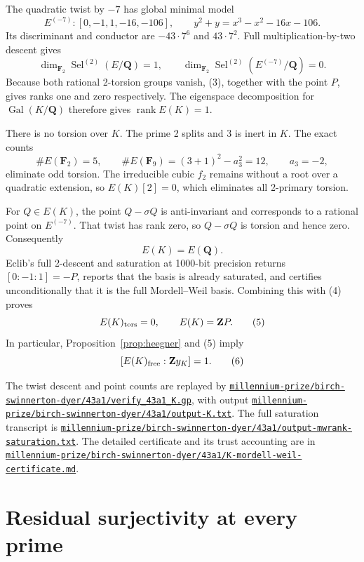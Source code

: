 \documentclass[11pt]{article}
\newcommand{\Q}{\mathbf Q}
\newcommand{\F}{\mathbf F}
\newcommand{\Z}{\mathbf Z}
\newcommand{\Gal}{\operatorname{Gal}}
\newcommand{\Sel}{\operatorname{Sel}}
\newcommand{\artifact}[1]{\href{run:../#1}{\nolinkurl{#1}}}
\begin{document}
The quadratic twist by \(-7\) has global minimal model
\[
 E^{(-7)}:[0,-1,1,-16,-106],
 \qquad y^2+y=x^3-x^2-16x-106.
\]
Its discriminant and conductor are \(-43\cdot7^6\) and \(43\cdot7^2\).
Full multiplication-by-two descent gives
\[
 \dim_{\F_2}\Sel^{(2)}(E/\Q)=1,
 \qquad
 \dim_{\F_2}\Sel^{(2)}(E^{(-7)}/\Q)=0.                 \tag{3}
\]
Because both rational 2-torsion groups vanish, (3), together with the point
\(P\), gives ranks one and zero respectively.  The eigenspace decomposition
for \(\Gal(K/\Q)\) therefore gives \(\operatorname{rank}E(K)=1\).

There is no torsion over \(K\).  The prime 2 splits and 3 is inert in \(K\).
The exact counts
\[
 \#E(\F_2)=5,
 \qquad
 \#E(\F_9)=(3+1)^2-a_3^2=12,
 \qquad a_3=-2,
\]
eliminate odd torsion.  The irreducible cubic \(f_2\) remains without a root
over a quadratic extension, so \(E(K)[2]=0\), which eliminates all 2-primary
torsion.

For \(Q\in E(K)\), the point \(Q-\sigma Q\) is anti-invariant and corresponds
to a rational point on \(E^{(-7)}\).  That twist has rank zero, so
\(Q-\sigma Q\) is torsion and hence zero.  Consequently
\[
 E(K)=E(\Q).                                             \tag{4}
\]
Eclib's full 2-descent and saturation at 1000-bit precision returns
\([0:-1:1]=-P\), reports that the basis is already saturated, and certifies
unconditionally that it is the full Mordell--Weil basis.  Combining this with
(4) proves
\begin{equation}
 E(K)_{\rm tors}=0,
 \qquad E(K)=\Z P.                                      \tag{5}
\end{equation}
In particular, Proposition~\ref{prop:heegner} and (5) imply
\[
 [E(K)_{\rm free}:\Z y_K]=1.                            \tag{6}
\]

The twist descent and point counts are replayed by
\artifact{millennium-prize/birch-swinnerton-dyer/43a1/verify_43a1_K.gp},
with output
\artifact{millennium-prize/birch-swinnerton-dyer/43a1/output-K.txt}.
The full saturation transcript is
\artifact{millennium-prize/birch-swinnerton-dyer/43a1/output-mwrank-saturation.txt}.
The detailed certificate and its trust accounting are in
\artifact{millennium-prize/birch-swinnerton-dyer/43a1/K-mordell-weil-certificate.md}.

\section{Residual surjectivity at every prime}
\end{document}
